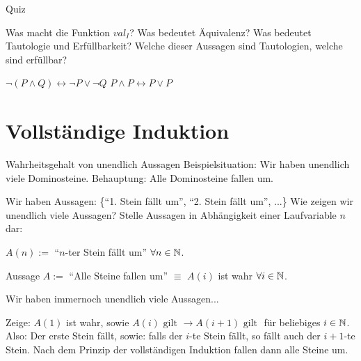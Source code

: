 \def\tutdate{17.11.2016}



\begin{frame}{Quiz}
	\begin{itemize}
		\pitem Was macht die Funktion $val_I$?
		\pitem Was bedeutet Äquivalenz?
		\pitem Was bedeutet Tautologie und Erfüllbarkeit?
		\pitem Welche dieser Aussagen sind Tautologien, welche sind erfüllbar?
		\begin{itemize}
			\pitem $\lnot (P \land Q) \leftrightarrow \lnot P \lor \lnot Q$
			\pitem $P \land P \leftrightarrow P \lor P$
		\end{itemize}
	\end{itemize}
\end{frame}

\section{Vollständige Induktion}
\begin{frame} {Wahrheitsgehalt von unendlich Aussagen}
	Beispielsituation: \p Wir haben unendlich viele Dominosteine. \p Behauptung: \p Alle Dominosteine fallen um.
	
	\begin{itemize}
		\pitem Wir haben Aussagen: \{``1. Stein fällt um'', ``2. Stein fällt um'', ...\}
		\pitem Wie zeigen wir unendlich viele Aussagen?
		\pitem Stelle Aussagen in Abhängigkeit einer Laufvariable $n$ dar:
		\begin{itemize}
			\pitem $A(n) := $ ``$n$-ter Stein fällt um'' $\forall n \in \mathbb{N}$.
		\end{itemize}
		\pitem Aussage $A := $ ``Alle Steine fallen um'' $\equiv$ $A(i)$ ist wahr $\forall i \in \mathbb{N}$.
	\end{itemize}

	\p Wir haben immernoch unendlich viele Aussagen...
	
	\begin{itemize}
		\pitem Zeige: $A(1)$ ist wahr\p , sowie $A(i)\text{ gilt } \rightarrow A(i+1)\text{ gilt }$ für beliebiges $i \in \mathbb{N}$.
		\pitem Also: \p Der erste Stein fällt, sowie: \p falls der $i$-te Stein fällt, so fällt auch der $i+1$-te Stein.
		\pitem Nach dem Prinzip der vollständigen Induktion fallen dann alle Steine um.
	\end{itemize}
\end{frame}

